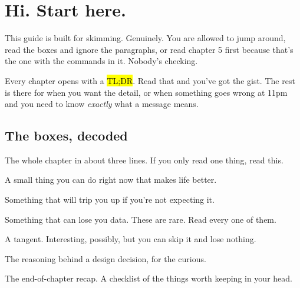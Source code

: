 \documentclass[10pt,oneside,openany]{book}
\begin{document}
\frontmatter
\makecover
\clearpage

\chapter*{Hi. Start here.}

This guide is built for skimming. Genuinely. You are allowed to jump
around, read the boxes and ignore the paragraphs, or read chapter 5 first
because that's the one with the commands in it. Nobody's checking.

Every chapter opens with a \hl{TL;DR}. Read that and you've got the gist. The
rest is there for when you want the detail, or when something goes wrong at
11pm and you need to know \emph{exactly} what a message means.

\section*{The boxes, decoded}

\begin{tldr}
The whole chapter in about three lines. If you only read one thing, read this.
\end{tldr}

\begin{quickwin}
A small thing you can do right now that makes life better.
\end{quickwin}

\begin{headsup}
Something that will trip you up if you're not expecting it.
\end{headsup}

\begin{danger}
Something that can lose you data. These are rare. Read every one of them.
\end{danger}

\begin{squirrel}
A tangent. Interesting, possibly, but you can skip it and lose nothing.
\end{squirrel}

\begin{whyso}
The reasoning behind a design decision, for the curious.
\end{whyso}

\begin{pocket}
The end-of-chapter recap. A checklist of the things worth keeping in your head.
\end{pocket}
\end{document}
